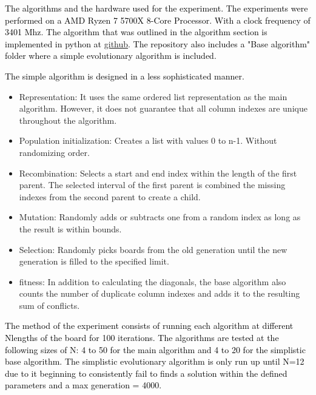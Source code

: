 \documentclass{scrartcl}
\begin{document}
\textcolor{black}{The algorithms and the hardware used for the experiment. The experiments were performed on a AMD Ryzen 7 5700X 8-Core Processor. With a clock frequency of 3401 Mhz. The algorithm that was outlined in the algorithm section is implemented in python at \href{https://github.com/Sneakycloud/N-queens\_problem\_Evolutionary\_Alg/tree/main}{github}. The repository also includes a "Base algorithm" folder where a simple evolutionary algorithm is included.}

\textcolor{black}{\newpage The simple algorithm is designed in a less sophisticated manner.}
\begin{itemize}
	\item Representation: It uses the same ordered list representation as the main algorithm. However, it does not guarantee that all column indexes are unique throughout the algorithm.
	\item Population initialization:  Creates a list with values 0 to n-1. Without randomizing order.
	\item Recombination: Selects a start and end index within the length of the first parent. The selected interval of the first parent is combined the missing indexes from the second parent to create a child.
	\item Mutation: Randomly adds or subtracts one from a random index as long as the result is within bounds.
	\item Selection: Randomly picks boards from the old generation until the new generation is filled to the specified limit.
	\item fitness: In addition to calculating the diagonals, the base algorithm also counts the number of duplicate column indexes and adds it to the resulting sum of conflicts. 
\end{itemize}

\textcolor{black}{The method of the experiment consists of running each algorithm at different N\-lengths of the board for 100 iterations. The algorithms are tested at the following sizes of N: 4 to 50 for the main algorithm and 4 to 20 for the simplistic base algorithm. The simplistic evolutionary algorithm is only run up until N=12 due to it beginning to consistently fail to finds a solution within the defined parameters and a max generation = 4000.}
\end{document}
